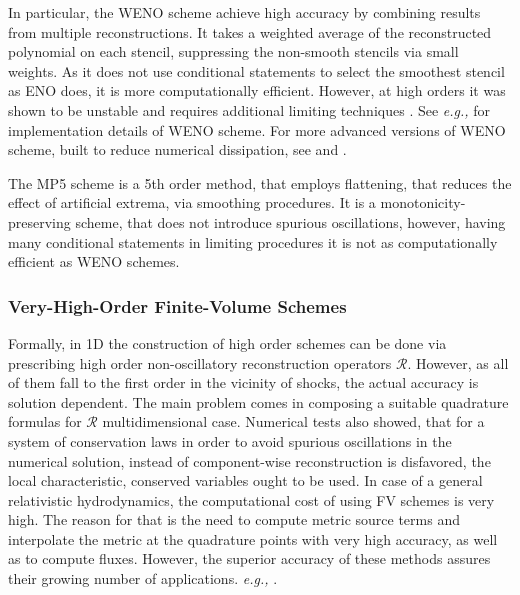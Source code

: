 \documentclass[11pt,a4paper,headinclude=true,DIV=14,BCOR=8mm,chapterprefix,listof=totoc,twoside,openright,abstracton]{scrbook}
\begin{document}
In particular, the WENO scheme achieve high accuracy by combining results from multiple reconstructions. It takes a weighted average of the reconstructed polynomial on each stencil, suppressing the non-smooth stencils via small weights. As it does not use conditional statements to select the smoothest stencil as ENO does, it is more computationally efficient. However, at high orders it was shown to be unstable and requires additional limiting techniques \cite{Gerolymos:2009,Tchekhovskoy:2007zn,Balsara:2000}. See \textit{e.g.,} \cite{Gerolymos:2009} for implementation details of WENO scheme. For more advanced versions of WENO scheme, built to reduce numerical dissipation, see \cite{Martin:2006} and \cite{Taylor:2007}. 

The MP5 scheme is a 5th order method, that employs flattening, that reduces the effect of artificial extrema, via smoothing procedures. It is a monotonicity-preserving scheme, that does not introduce spurious oscillations, however, having many conditional statements in limiting procedures it is not as computationally efficient as WENO schemes.


\subsubsection{Very-High-Order Finite-Volume Schemes}

Formally, in 1D the construction of high order schemes can be done via prescribing high order non-oscillatory reconstruction operators $\mathcal{R}$. However, as all of them fall to the first order in the vicinity of shocks, the actual accuracy is solution dependent. The main problem comes in composing a suitable quadrature formulas for $\mathcal{R}$ multidimensional case. Numerical tests also showed, that for a system of conservation laws in order to avoid spurious oscillations in the numerical solution, instead of component-wise reconstruction is disfavored, the local characteristic, conserved variables ought to be used. In case of a general relativistic hydrodynamics, the computational cost of using FV schemes is very high. The reason for that is the need to  compute metric source terms and interpolate the metric at the quadrature points with very high accuracy, as well as to compute fluxes. However, the superior accuracy of these methods assures their growing number of applications. \textit{e.g.,} \cite{Tchekhovskoy:2007zn,Dumbser:2007}.

\end{document}
